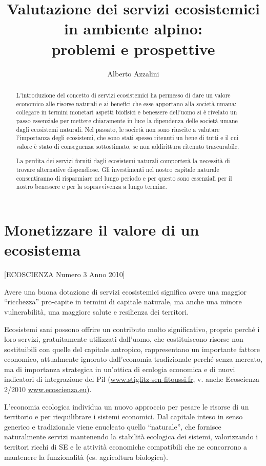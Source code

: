 \documentclass[11pt,a4paper]{article}
\author{Alberto Azzalini}
\title{Valutazione dei servizi ecosistemici in ambiente alpino:\\ problemi e prospettive}
\begin{document}
	\maketitle
	\begin{abstract}
		L'introduzione del concetto di servizi ecosistemici ha permesso di dare un valore economico alle risorse naturali e ai benefici che esse apportano alla società umana: collegare in termini monetari aspetti biofisici e benessere dell'uomo si è rivelato un passo essenziale per mettere chiaramente in luce la dipendenza delle società umane dagli ecosistemi naturali.
		Nel passato, le società non sono riuscite a valutare l'importanza degli ecosistemi, che sono stati spesso ritenuti un bene di tutti e il cui valore è stato di conseguenza sottostimato, se non addirittura ritenuto trascurabile.
		
		La perdita dei servizi forniti dagli ecosistemi naturali comporterà la necessità di trovare alternative dispendiose. Gli investimenti nel nostro capitale naturale consentiranno di risparmiare nel lungo periodo e per questo sono essenziali per il nostro benessere e per la sopravvivenza a lungo termine. \cite{Ecosystem_goods_and_services}
		
		
	\end{abstract}
	\section{Monetizzare il valore di un ecosistema}

	[ECOSCIENZA Numero 3 Anno 2010]
	
	
	Avere una buona dotazione di servizi
	ecosistemici significa avere una maggior
	``ricchezza'' pro-capite in termini di
	capitale naturale, ma anche una minore
	vulnerabilità, una maggiore salute e
	resilienza dei territori.
	
	Ecosistemi sani possono offrire un contributo
	molto significativo, proprio perché i loro servizi, gratuitamente utilizzati dall'uomo, che costituiscono risorse	non sostituibili con quelle del capitale
	antropico, rappresentano un importante
	fattore economico, attualmente ignorato
	dall'economia tradizionale perché senza
	mercato, ma di importanza strategica in
	un'ottica di ecologia economica e di nuovi
	indicatori di integrazione del Pil (\url{www.stiglitz-sen-fitoussi.fr}, v. anche Ecoscienza
	2/2010 \url{www.ecoscienza.eu}).
	
	L'economia ecologica individua un
	nuovo approccio per pesare le risorse
	di un territorio e per riequilibrare i
	sistemi economici. Dal capitale inteso in senso generico e tradizionale viene enucleato quello ``naturale'', che fornisce naturalmente servizi mantenendo la stabilità ecologica dei sistemi,
	valorizzando i territori ricchi di SE e le
	attività economiche compatibili che ne
	concorrono a mantenere la funzionalità
	(es. agricoltura biologica). 
	
\end{document}
